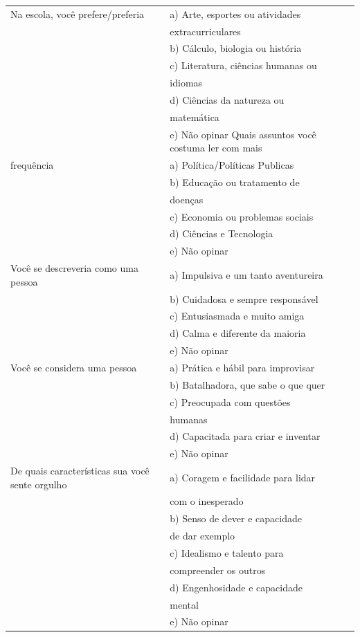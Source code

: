 \documentclass[
	12pt,				%
    oneside,			%
	a4paper,			%
	english,			%
	french,				%
	spanish,			%
	brazil,				%
	]{abntex2}
\begin{document}
\begin{apendicesenv}
\begin{center}
\begin{longtable}{l|l}
\hline \hline
\endlastfoot
    \hline
    Na escola, você prefere/preferia & a) Arte, esportes ou atividades \\ & extracurriculares \\ & b) Cálculo, biologia ou história\\ & c) Literatura, ciências humanas ou \\ & idiomas\\ & d) Ciências da natureza ou \\ & matemática\\ & e) Não opinar
    \hline
    Quais assuntos você costuma ler com mais \\ frequência & a) Política/Políticas Publicas\\ & b) Educação ou tratamento de \\ & doenças\\ & c) Economia ou problemas sociais\\ & d) Ciências e Tecnologia\\ & e) Não opinar 
    \\ \hline
    Você se descreveria como uma pessoa & a) Impulsiva e um tanto aventureira\\ & b) Cuidadosa e sempre responsável \\ & c) Entusiasmada e muito amiga\\ & d) Calma e diferente da maioria\\ & e) Não opinar
    \\ \hline
    Você se considera uma pessoa & a) Prática e hábil para improvisar\\ & b) Batalhadora, que sabe o que quer\\ & c) Preocupada com questões \\ & humanas\\ & d) Capacitada para criar e inventar\\ & e) Não opinar
    \\ \hline
    De quais características sua você sente orgulho & a) Coragem e facilidade para lidar \\ & com o inesperado\\ & b) Senso de dever e capacidade \\ & de dar exemplo\\ & c) Idealismo e talento para \\ & compreender os outros\\ & d) Engenhosidade e capacidade \\ & mental\\ & e) Não opinar
    \\ \hline

\end{longtable}
\end{center}
\end{apendicesenv}
\end{document}
